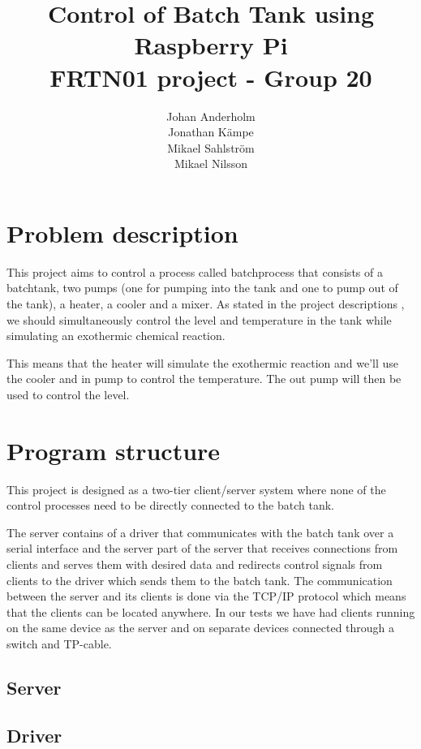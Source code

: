 \documentclass{article}
\title{Control of Batch Tank using Raspberry Pi \\ FRTN01 project - Group 20}
\date{}
\author{Johan Anderholm \\ Jonathan Kämpe \\ Mikael Sahlström \\ Mikael Nilsson}
\begin{document}
\maketitle
\newpage
\tableofcontents
\newpage
\section{Problem description}
This project aims to control a process called batchprocess that consists of a batchtank, two pumps (one for pumping into the tank and one to pump out of the tank), a heater, a cooler and a mixer. As stated in the project descriptions \cite[p.~6]{project12}, we should simultaneously control the level and temperature in the tank while simulating an exothermic chemical reaction.

This means that the heater will simulate the exothermic reaction and we'll use the cooler and in pump to control the temperature. The out pump will then be used to control the level.

\section{Program structure}
This project is designed as a two-tier client/server system \cite[p.~6]{clientserver} where none of the control processes need to be directly connected to the batch tank.

The server contains of a driver that communicates with the batch tank over a serial interface and the server part of the server that receives connections from clients and serves them with desired data and redirects control signals from clients to the driver which sends them to the batch tank. The communication between the server and its clients is done via the TCP/IP protocol which means that the clients can be located anywhere. In our tests we have had clients running on the same device as the server and on separate devices connected through a switch and TP-cable.

\subsection{Server}

\subsection{Driver}
\end{document}
